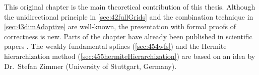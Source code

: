 This original chapter is the main theoretical contribution of this thesis.
Although the unidirectional principle in \cref{sec:42fullGrids} and
the combination technique in \cref{sec:43dimAdaptive} are well-known,
the presentation with formal proofs of correctness is new.
Parts of the chapter have already been published in scientific papers
\cite{Valentin18Fundamental}.
The weakly fundamental splines (\cref{sec:454wfs}) and the
Hermite hierarchization method (\cref{sec:455hermiteHierarchization})
are based on an idea by Dr.\ Stefan Zimmer (University of Stuttgart, Germany).









\cleardoublepage

